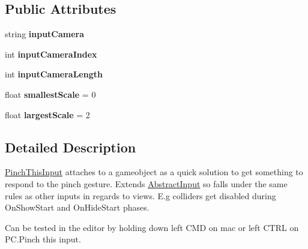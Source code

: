 \subsection*{Public Attributes}
\begin{DoxyCompactItemize}
\item 
\hypertarget{class_scaffolding_1_1_pinch_this_input_ae6d32155af42acf9b1316c874626b2b4}{string {\bfseries input\+Camera}}\label{class_scaffolding_1_1_pinch_this_input_ae6d32155af42acf9b1316c874626b2b4}

\item 
\hypertarget{class_scaffolding_1_1_pinch_this_input_a52967dabb3c854e6aeb501f3423feb0d}{int {\bfseries input\+Camera\+Index}}\label{class_scaffolding_1_1_pinch_this_input_a52967dabb3c854e6aeb501f3423feb0d}

\item 
\hypertarget{class_scaffolding_1_1_pinch_this_input_a8c0727e05a84d7ee4e9136b728302f77}{int {\bfseries input\+Camera\+Length}}\label{class_scaffolding_1_1_pinch_this_input_a8c0727e05a84d7ee4e9136b728302f77}

\item 
\hypertarget{class_scaffolding_1_1_pinch_this_input_acb30c6b37a2031dccf9951608e247136}{float {\bfseries smallest\+Scale} = 0}\label{class_scaffolding_1_1_pinch_this_input_acb30c6b37a2031dccf9951608e247136}

\item 
\hypertarget{class_scaffolding_1_1_pinch_this_input_af682306ce14b0aea6fae51486784857e}{float {\bfseries largest\+Scale} = 2}\label{class_scaffolding_1_1_pinch_this_input_af682306ce14b0aea6fae51486784857e}

\end{DoxyCompactItemize}


\subsection{Detailed Description}
\hyperlink{class_scaffolding_1_1_pinch_this_input}{Pinch\+This\+Input} attaches to a gameobject as a quick solution to get something to respond to the pinch gesture. Extends \hyperlink{class_scaffolding_1_1_abstract_input}{Abstract\+Input} so falls under the same rules as other inputs in regards to views. E.\+g colliders get disabled during On\+Show\+Start and On\+Hide\+Start phases. 

Can be tested in the editor by holding down left C\+M\+D on mac or left C\+T\+R\+L on P\+C.\+Pinch this input. 

